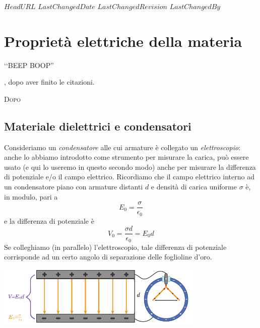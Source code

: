\svnidlong
{$HeadURL$}
{$LastChangedDate$}
{$LastChangedRevision$}
{$LastChangedBy$}

\chapter{Proprietà elettriche della materia}

\begin{introduction}
	‘‘BEEP BOOP''
	\begin{flushright}
		, dopo aver finito le citazioni. %
	\end{flushright}
\end{introduction}
\lettrine[findent=1pt, nindent=0pt]{D}{opo}
\section{Materiale dielettrici e condensatori}
Consideriamo un \textit{condensatore} alle cui armature è collegato un \textit{elettroscopio}: anche lo abbiamo introdotto come strumento per misurare la carica, può essere usato (e qui lo useremo in questo secondo modo) anche per misurare la differenza di potenziale e/o il campo elettrico. Ricordiamo che il campo elettrico interno ad un condensatore piano con armature distanti $d$ e densità di carica uniforme $\sigma$ è, in modulo, pari a
\begin{equation*}
	E_0=\frac{\sigma}{\epsilon_0}
\end{equation*}
e la differenza di potenziale è
\begin{equation*}
	V_0=\frac{\sigma d}{\epsilon_0}=E_0d
\end{equation*}
Se colleghiamo (in parallelo) l'elettroscopio, tale differenza di potenziale corrisponde ad un certo angolo di separazione delle foglioline d'oro. 
\begin{center}
	\includegraphics[width=0.75\textwidth]{images/chp6/chp6elettroscopio1.pdf}
\end{center}
